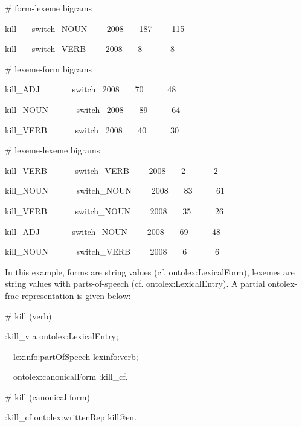 \documentclass[a4paper]{article}
\newcommand\textstyleSourceText[1]{\textrm{#1}}
\newcommand\textstyleTeletype[1]{\textrm{#1}}
\begin{document}
\textstyleSourceText{\# form-lexeme bigrams}

\textstyleSourceText{kill \ \ \ switch\_NOUN \ \ \ \ 2008 \ \ \ 187 \ \ \ \ 115}

\textstyleSourceText{kill \ \ \ switch\_VERB \ \ \ \ 2008 \ \ \ 8 \ \ \ \ \ \ 8}


\bigskip

\textstyleSourceText{\# lexeme-form bigrams}

\textstyleSourceText{kill\_ADJ \ \ \ \ \ \ \ switch \ 2008 \ \ \ 70 \ \ \ \ \ 48}

\textstyleSourceText{kill\_NOUN \ \ \ \ \ \ switch \ 2008 \ \ \ 89 \ \ \ \ \ 64}

\textstyleSourceText{kill\_VERB \ \ \ \ \ \ switch \ 2008 \ \ \ 40 \ \ \ \ \ 30}


\bigskip

\textstyleSourceText{\# lexeme-lexeme bigrams}

\textstyleSourceText{kill\_VERB \ \ \ \ \ \ switch\_VERB \ \ \ \ 2008 \ \ \ 2 \ \ \ \ \ \ 2}

\textstyleSourceText{kill\_NOUN \ \ \ \ \ \ switch\_NOUN \ \ \ \ 2008 \ \ \ 83 \ \ \ \ \ 61}

\textstyleSourceText{kill\_VERB \ \ \ \ \ \ switch\_NOUN \ \ \ \ 2008 \ \ \ 35 \ \ \ \ \ 26}

\textstyleSourceText{kill\_ADJ \ \ \ \ \ \ \ switch\_NOUN \ \ \ \ 2008 \ \ \ 69 \ \ \ \ \ 48}

\textstyleSourceText{kill\_NOUN \ \ \ \ \ \ switch\_VERB \ \ \ \ 2008 \ \ \ 6 \ \ \ \ \ \ 6}

In this example, forms are string values (cf. \textstyleTeletype{ontolex:LexicalForm}), lexemes are string values with parts-of-speech (cf. \textstyleTeletype{ontolex:LexicalEntry}). A partial ontolex-frac representation is given below: 


\bigskip

\textstyleSourceText{\# kill (verb)}

\textstyleSourceText{:kill\_v a ontolex:LexicalEntry;}

\textstyleSourceText{\ \ lexinfo:partOfSpeech lexinfo:verb;}

\textstyleSourceText{\ \ ontolex:canonicalForm :kill\_cf.}


\bigskip

\textstyleSourceText{\# kill (canonical form)}

\textstyleSourceText{:kill\_cf ontolex:writtenRep {\textquotedbl}kill{\textquotedbl}@en.}
\end{document}
